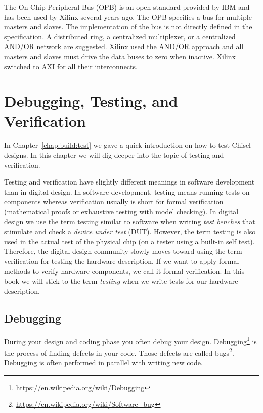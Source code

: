 \documentclass[%
    10pt,
    headinclude, footexclude,
    openright, %
    notitlepage,
    cleardoubleempty,
    headsepline,
    pointlessnumbers,
    bibtotoc, idxtotoc,
    ]{scrbook}
\newcommand{\myref}[2]{\href{#1}{#2}}
\renewcommand{\myref}[2]{{#2}{\footnote{\url{#1}}}}
\begin{document}
The On-Chip Peripheral Bus (OPB) \cite{soc:opb} is an open standard
provided by IBM and has been used by Xilinx several years ago.
The OPB specifies a bus for
multiple masters and slaves. The implementation of the bus is not
directly defined in the specification. A distributed ring, a
centralized multiplexer, or a centralized AND/OR network are
suggested. Xilinx used the AND/OR approach and all masters and
slaves must drive the data buses to zero when inactive.
Xilinx switched to AXI for all their interconnects.


\chapter{Debugging, Testing, and Verification}
\label{chap:testing}



In Chapter~\ref{chap:build:test} we gave a quick introduction on how to test
Chisel designs. In this chapter we will dig deeper into the topic of testing and
verification.

Testing and verification have slightly different meanings in software development
than in digital design. In software development, testing means running tests on components
whereas verification usually is short for formal verification (mathematical proofs or exhaustive testing
with model checking). In digital design we use the term testing similar to software when writing
\emph{test benches} that stimulate and check a \emph{device under test} (DUT). However, the term testing
is also used in the actual test of the physical chip (on a tester using a built-in self test).
Therefore, the digital design community slowly moves toward using the term verification for
testing the hardware description. If we want to apply formal methods to verify hardware
components, we call it formal verification. In this book we will stick to the term \emph{testing}
when we write tests for our hardware description.


\section{Debugging}

During your design and coding phase you often debug your design.
\myref{https://en.wikipedia.org/wiki/Debugging}{Debugging} is the process of
finding defects in your code. Those defects are called
\myref{https://en.wikipedia.org/wiki/Software_bug}{bugs}.
Debugging is often performed in parallel with writing new code.
\end{document}
